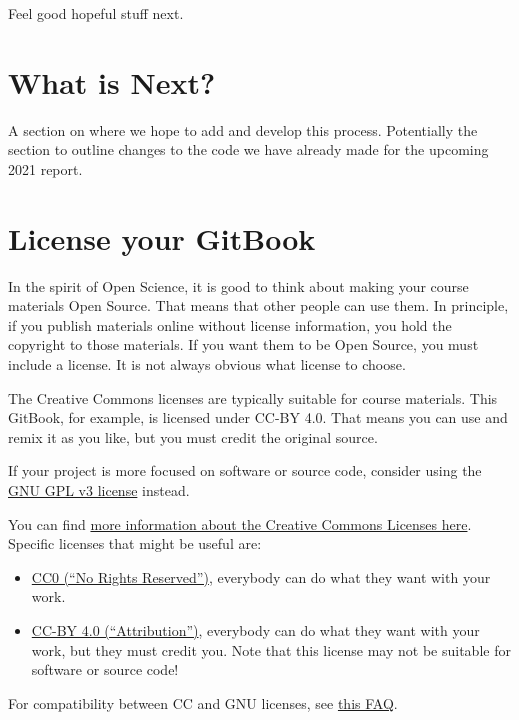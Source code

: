 \documentclass[
]{book}
\providecommand{\tightlist}{%
  \setlength{\itemsep}{0pt}\setlength{\parskip}{0pt}}
\begin{document}
Feel good hopeful stuff next.

\hypertarget{what-is-next}{%
\chapter{What is Next?}\label{what-is-next}}

A section on where we hope to add and develop this process. Potentially the section to outline changes to the code we have already made for the upcoming 2021 report.

\hypertarget{license-your-gitbook}{%
\chapter{License your GitBook}\label{license-your-gitbook}}

In the spirit of Open Science, it is good to think about making your course materials Open Source. That means that other people can use them. In principle, if you publish materials online without license information, you hold the copyright to those materials. If you want them to be Open Source, you must include a license. It is not always obvious what license to choose.

The Creative Commons licenses are typically suitable for course materials. This GitBook, for example, is licensed under CC-BY 4.0. That means you can use and remix it as you like, but you must credit the original source.

If your project is more focused on software or source code, consider using the \href{https://www.gnu.org/licenses/gpl-3.0.en.html}{GNU GPL v3 license} instead.

You can find \href{https://creativecommons.org/share-your-work/licensing-examples}{more information about the Creative Commons Licenses here}. Specific licenses that might be useful are:

\begin{itemize}
\tightlist
\item
  \href{https://creativecommons.org/share-your-work/public-domain/cc0/}{CC0 (``No Rights Reserved'')}, everybody can do what they want with your work.
\item
  \href{https://creativecommons.org/licenses/by/4.0/}{CC-BY 4.0 (``Attribution'')}, everybody can do what they want with your work, but they must credit you. Note that this license may not be suitable for software or source code!
\end{itemize}

For compatibility between CC and GNU licenses, see \href{https://creativecommons.org/faq/\#Can_I_apply_a_Creative_Commons_license_to_software.3F}{this FAQ}.

  
\end{document}
